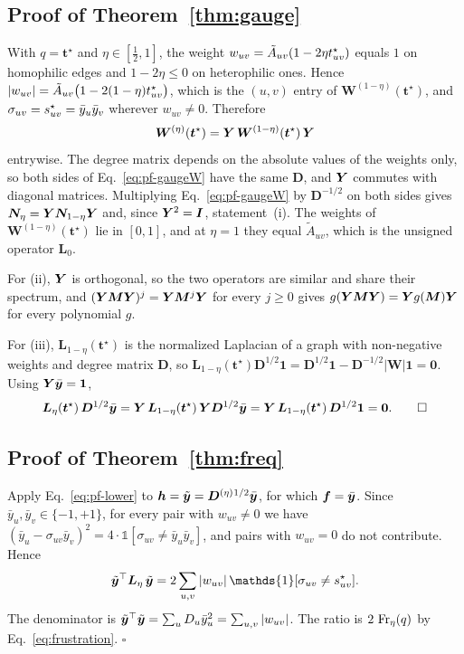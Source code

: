 \subsection{Proof of Theorem~\ref{thm:gauge}}
With $q=\bm t^\star$ and $\eta\in[\tfrac12,1]$, the weight $w_{uv}=\tilde A_{uv}(1-2\eta t^{\star}_{uv})$ equals $1$ on homophilic edges and $1-2\eta\le0$ on heterophilic ones.
Hence $|w_{uv}|=\tilde A_{uv}\bigl(1-2(1-\eta)t^{\star}_{uv}\bigr)$, which is the $(u,v)$ entry of $\bm W^{(1-\eta)}(\bm t^\star)$, and $\sigma_{uv}=s^{\star}_{uv}=\bar y_u\bar y_v$ wherever $w_{uv}\neq0$.
Therefore
\begin{equation}
\bm W^{(\eta)}(\bm t^\star)=\bm{Y}\,\bm W^{(1-\eta)}(\bm t^\star)\,\bm{Y}
\label{eq:pf-gaugeW}
\end{equation}
entrywise.
The degree matrix depends on the absolute values of the weights only, so both sides of Eq.~\eqref{eq:pf-gaugeW} have the same $\bm D$, and $\bm{Y}$ commutes with diagonal matrices.
Multiplying Eq.~\eqref{eq:pf-gaugeW} by $\bm D^{-1/2}$ on both sides gives $\bm N_\eta=\bm{Y}\bm N_{1-\eta}\bm{Y}$ and, since $\bm{Y}^2=\bm I$, statement~(i).
The weights of $\bm W^{(1-\eta)}(\bm t^\star)$ lie in $[0,1]$, and at $\eta=1$ they equal $\tilde A_{uv}$, which is the unsigned operator $\bm L_0$.

For (ii), $\bm{Y}$ is orthogonal, so the two operators are similar and share their spectrum, and $(\bm{Y}\bm M\bm{Y})^j=\bm{Y}\bm M^j\bm{Y}$ for every $j\ge0$ gives $g(\bm{Y}\bm M\bm{Y})=\bm{Y} g(\bm M)\bm{Y}$ for every polynomial $g$.

For (iii), $\bm L_{1-\eta}(\bm t^\star)$ is the normalized Laplacian of a graph with non-negative weights and degree matrix $\bm D$, so $\bm L_{1-\eta}(\bm t^\star)\bm D^{1/2}\bm 1=\bm D^{1/2}\bm 1-\bm D^{-1/2}|\bm W|\bm 1=\bm 0$.
Using $\bm{Y}\bar{\bm{y}}=\bm 1$,
\[
\bm L_\eta(\bm t^\star)\,\bm D^{1/2}\bar{\bm{y}}
=\bm{Y}\,\bm L_{1-\eta}(\bm t^\star)\,\bm{Y}\bm D^{1/2}\bar{\bm{y}}
=\bm{Y}\,\bm L_{1-\eta}(\bm t^\star)\,\bm D^{1/2}\bm 1=\bm 0.
\tag*{$\square$}
\]

\subsection{Proof of Theorem~\ref{thm:freq}}
Apply Eq.~\eqref{eq:pf-lower} to $\bm h=\tilde{\bm{y}}=\bm{D}^{(\eta)}{}^{1/2}\bar{\bm{y}}$, for which $\bm f=\bar{\bm{y}}$.
Since $\bar y_u,\bar y_v\in\{-1,+1\}$, for every pair with $w_{uv}\neq0$ we have $(\bar y_u-\sigma_{uv}\bar y_v)^2=4\cdot\mathds{1}[\sigma_{uv}\neq\bar y_u\bar y_v]$, and pairs with $w_{uv}=0$ do not contribute.
Hence
\[
\yt^{\top}\Lb\,\yt=2\sum_{u,v}|w_{uv}|\,\mathds{1}[\sigma_{uv}\neq\sstar_{uv}].
\]
The denominator is $\tilde{\bm{y}}^{\top}\tilde{\bm{y}}=\sum_uD_u\bar y_u^2=\sum_{u,v}|w_{uv}|$.
The ratio is $2\,\operatorname{Fr}_\eta(q)$ by Eq.~\eqref{eq:frustration}.
\hfill$\square$

